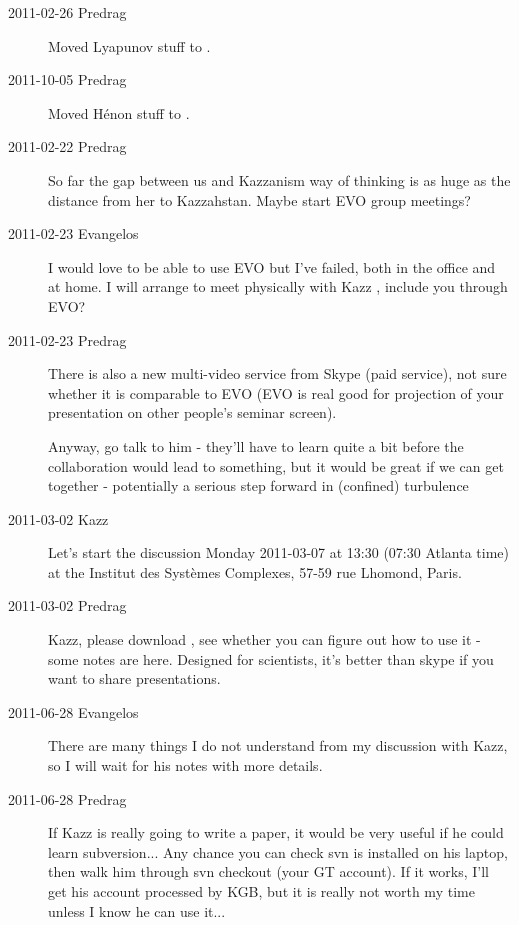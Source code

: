 \begin{description}

\item[2011-02-26 Predrag] Moved Lyapunov stuff to
    .

\item[2011-10-05 Predrag] Moved H\'enon stuff to
    .

\item[2011-02-22 Predrag]
So far the gap between us and Kazzanism way of thinking is as huge
as the distance from her to Kazzahstan.
Maybe start EVO group meetings?

\item[2011-02-23 Evangelos]
I would love to be able to use EVO but I've
    failed, both in the office and at home. I will arrange to meet
    physically with Kazz \etal, include you
    through EVO?

\item[2011-02-23 Predrag]
There is also a new multi-video service from Skype (paid service), not
sure whether it is comparable to EVO (EVO is real good for projection of
your presentation on other people's seminar screen).

Anyway, go talk to him - they'll have to learn quite a bit before the
collaboration would lead to something, but it would be great if we can
get together - potentially a serious step forward in (confined)
turbulence

\item[2011-03-02 Kazz] Let's start the discussion
 Monday 2011-03-07 at 13:30 (07:30 Atlanta time) at the Institut des
 Syst\`emes Complexes, 57-59 rue Lhomond, Paris.

\item[2011-03-02 Predrag] Kazz, please download
, see whether you can
figure out how to use it - some notes are
{here}. Designed for scientists, it's better than skype if you want to
share presentations.

\item[2011-06-28 Evangelos]
There are many things I do not understand from my discussion with Kazz,
so I will wait for his notes with more details.

\item[2011-06-28 Predrag] If Kazz is really going to write a paper, it
would be very useful if he could learn subversion... Any chance you can
check svn is installed on his laptop, then walk him through svn checkout
(your GT account). If it works, I'll get his account processed by KGB,
but it is really not worth my time unless I know he can use it...


\end{description}
